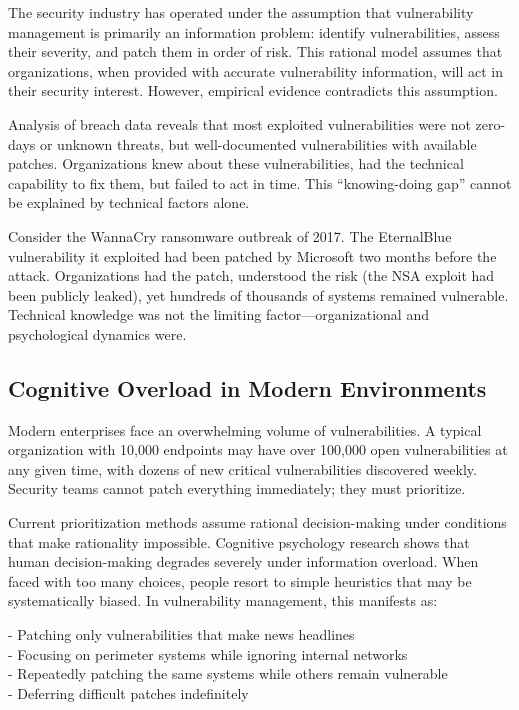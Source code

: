 \documentclass[11pt,a4paper]{article}
\begin{document}
The security industry has operated under the assumption that vulnerability management is primarily an information problem: identify vulnerabilities, assess their severity, and patch them in order of risk. This rational model assumes that organizations, when provided with accurate vulnerability information, will act in their security interest. However, empirical evidence contradicts this assumption.

Analysis of breach data reveals that most exploited vulnerabilities were not zero-days or unknown threats, but well-documented vulnerabilities with available patches\cite{ransomware2023}. Organizations knew about these vulnerabilities, had the technical capability to fix them, but failed to act in time. This ``knowing-doing gap'' cannot be explained by technical factors alone.

Consider the WannaCry ransomware outbreak of 2017. The EternalBlue vulnerability it exploited had been patched by Microsoft two months before the attack. Organizations had the patch, understood the risk (the NSA exploit had been publicly leaked), yet hundreds of thousands of systems remained vulnerable. Technical knowledge was not the limiting factor—organizational and psychological dynamics were.

\subsection{Cognitive Overload in Modern Environments}

Modern enterprises face an overwhelming volume of vulnerabilities. A typical organization with 10,000 endpoints may have over 100,000 open vulnerabilities at any given time, with dozens of new critical vulnerabilities discovered weekly\cite{nvd2023}. Security teams cannot patch everything immediately; they must prioritize.

Current prioritization methods assume rational decision-making under conditions that make rationality impossible. Cognitive psychology research shows that human decision-making degrades severely under information overload\cite{miller1956}. When faced with too many choices, people resort to simple heuristics that may be systematically biased. In vulnerability management, this manifests as:

- Patching only vulnerabilities that make news headlines\\
- Focusing on perimeter systems while ignoring internal networks\\
- Repeatedly patching the same systems while others remain vulnerable\\
- Deferring difficult patches indefinitely\\
\end{document}

